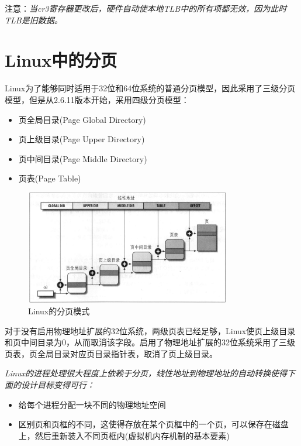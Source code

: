     注意：\emph{当cr3寄存器更改后，硬件自动使本地TLB中的所有项都无效，因为此时TLB是旧数据。}

\section{Linux中的分页}

    Linux为了能够同时适用于32位和64位系统的普通分页模型，因此采用了三级分页模型，但是从2.6.11版本开始，采用四级分页模型：

\begin{itemize}
    \item 页全局目录(Page Global Directory)
    \item 页上级目录(Page Upper Directory)
    \item 页中间目录(Page Middle Directory)
    \item 页表(Page Table)
\end{itemize}

\begin{figure}[!htbp]
    \centering
    \includegraphics[width=0.8\textwidth]{image/chapter02/Linux的分页模式.png}
    \caption{Linux的分页模式}
\end{figure}

    对于没有启用物理地址扩展的32位系统，两级页表已经足够，Linux使页上级目录和页中间目录为0，从而取消该字段。启用了物理地址扩展的32位系统采用了三级页表，页全局目录对应页目录指针表，取消了页上级目录。

    \emph{Linux的进程处理很大程度上依赖于分页，线性地址到物理地址的自动转换使得下面的设计目标变得可行：}

\begin{itemize}
    \item 给每个进程分配一块不同的物理地址空间
    \item 区别页和页框的不同，这使得存放在某个页框中的一个页，可以保存在磁盘上，然后重新装入不同页框内(虚拟机内存机制的基本要素)
\end{itemize}

